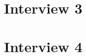 \documentclass[letterpaper]{report}
\begin{document}
\vspace{\baselineskip}
\noindent 

\newpage
\section{Interview 3}



\newpage
\section{Interview 4}


\end{document}
